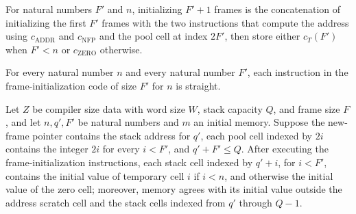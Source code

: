 \begin{theorem}
\label{Light.Compiler.frameInit_succ}
\leanok
{}
For natural numbers $F'$ and $n$, initializing $F'+1$ frames is the concatenation of
initializing the first $F'$ frames with the two instructions that compute the address
using $c_{\mathrm{ADDR}}$ and $c_{\mathrm{NFP}}$ and the pool cell at index $2F'$, then
store either $c_T(F')$ when $F'<n$ or $c_{\mathrm{ZERO}}$ otherwise.
\end{theorem}

\begin{theorem}
\label{Light.Compiler.straight_frameInit}
\leanok
{}
For every natural number $n$ and every natural number $F'$, each instruction in the
frame-initialization code of size $F'$ for $n$ is straight.
\end{theorem}

\begin{theorem}
\label{Light.Compiler.effects_frameInit}
\leanok
{}
Let $Z$ be compiler size data with word size $W$, stack capacity $Q$, and frame size
$F$, and let $n,q',F'$ be natural numbers and $m$ an initial memory. Suppose the
new-frame pointer contains the stack address for $q'$, each pool cell indexed by $2i$
contains the integer $2i$ for every $i<F'$, and $q'+F'\le Q$. After executing the
frame-initialization instructions, each stack cell indexed by $q'+i$, for $i<F'$,
contains the initial value of temporary cell $i$ if $i<n$, and otherwise the initial
value of the zero cell; moreover, memory agrees with its initial value outside the
address scratch cell and the stack cells indexed from $q'$ through $Q-1$.
\end{theorem}

